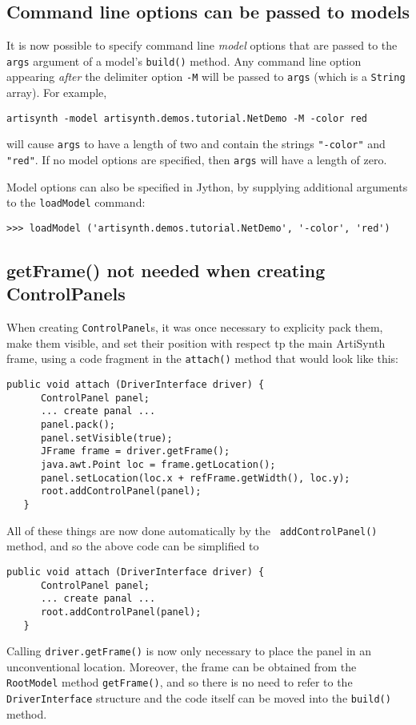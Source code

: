 \documentclass{article}
\begin{document}
\subsection*{Command line options can be passed to models}

It is now possible to specify command line {\it model} options that
are passed to the {\tt args} argument of a model's {\tt build()}
method. Any command line option appearing {\it after} the delimiter
option {\tt -M} will be passed to {\tt args} (which is a {\tt String}
array). For example,
%
\begin{lstlisting}[]
   artisynth -model artisynth.demos.tutorial.NetDemo -M -color red
\end{lstlisting}
%
will cause {\tt args} to have a length of two and contain the
strings {\tt "-color"} and {\tt "red"}. If no model options are
specified, then {\tt args} will have a length of zero.

Model options can also be specified in Jython, by supplying additional
arguments to the {\tt loadModel} command:
%
\begin{lstlisting}[]
   >>> loadModel ('artisynth.demos.tutorial.NetDemo', '-color', 'red')
\end{lstlisting}
%

\subsection*{getFrame() not needed when creating ControlPanels}

When creating {\tt ControlPanel}s, it was once necessary to explicity
pack them, make them visible, and set their position with respect tp
the main ArtiSynth frame, using a code fragment in the {\tt attach()}
method that would look like this:
%
\begin{lstlisting}[]
   public void attach (DriverInterface driver) {
      ControlPanel panel;
      ... create panal ...
      panel.pack();
      panel.setVisible(true);
      JFrame frame = driver.getFrame();
      java.awt.Point loc = frame.getLocation();
      panel.setLocation(loc.x + refFrame.getWidth(), loc.y);
      root.addControlPanel(panel);
   }
\end{lstlisting}
%
All of these things are now done automatically by the {\tt
addControlPanel()} method, and so the above code can be simplified to
%
\begin{lstlisting}[]
   public void attach (DriverInterface driver) {
      ControlPanel panel;
      ... create panal ...
      root.addControlPanel(panel);
   }
\end{lstlisting}
%
Calling {\tt driver.getFrame()} is now only necessary to place the
panel in an unconventional location. Moreover, the frame can be
obtained from the {\tt RootModel} method {\tt getFrame()}, and so
there is no need to refer to the {\tt DriverInterface} structure and
the code itself can be moved into the {\tt build()} method.
\end{document}
